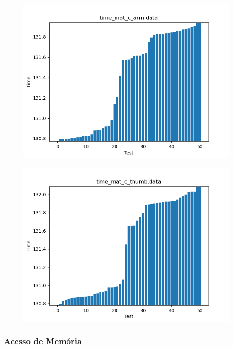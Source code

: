 \documentclass[a4paper,10pt]{article}
\begin{document}
\begin{figure}[H]
 \includegraphics[width=\linewidth]{data/time_mat_c_arm_sorted.png}
\end{figure}

\begin{figure}[H]
 \includegraphics[width=\linewidth]{data/time_mat_c_thumb_sorted.png}
\end{figure}

\subsubsection*{Acesso de Memória}
\end{document}
